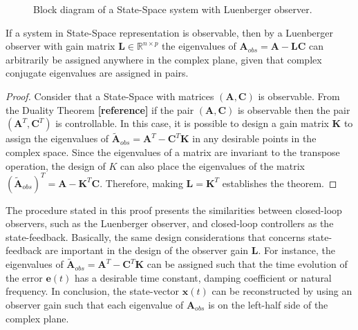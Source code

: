 \documentclass[a4paper,11pt]{book}
\numberwithin{figure}{chapter}
\numberwithin{equation}{chapter}
\numberwithin{table}{chapter}
\newtheorem{theorem}{Theorem}[chapter]
\theoremstyle{definition}
\newcounter{boxed-theorem}
\newenvironment{boxed-theorem}[1]
{\colorlet{shadecolor}{pastelBlue2!10} \begin{shaded} \begin{theorem}{#1}}
{\end{theorem} \end{shaded}}
\newcounter{boxed-definition}
\newcounter{boxed-example}
\begin{document}
\begin{figure}[ht]
{ 
    }
    \caption{Block diagram of a State-Space system with Luenberger observer.}
    \label{fig:luenberger01}
\end{figure}

\begin{boxed-theorem}
    If a system in State-Space representation is observable, then by a Luenberger observer with gain matrix $\bm{L} \in \mathbb{R}^{n \times p}$ the eigenvalues of $\bm{A}_{obs} = \bm{A} - \bm{L} \bm{C}$ can arbitrarily be assigned anywhere in the complex plane, given that complex conjugate eigenvalues are assigned in pairs.
\end{boxed-theorem} 

\begin{proof}
    Consider that a State-Space with matrices $(\bm{A}, \bm{C})$ is observable. From the Duality Theorem \textbf{[reference]} if the pair $(\bm{A}, \bm{C})$ is observable then the pair $(\bm{A}^T, \bm{C}^T)$ is controllable. In this case, it is possible to design     a gain matrix $\bm{K}$ to assign the eigenvalues of $\tilde{\bm{A}}_{obs} = \bm{A}^T - \bm{C}^T \bm{K}$ in any desirable points in the complex space. Since the eigenvalues of a matrix are invariant to the transpose operation, the design of $K$ can also place the eigenvalues of the matrix $(\tilde{\bm{A}}_{obs})^T = \bm{A} - \bm{K}^T \bm{C}$. Therefore, making $\bm{L} = \bm{K}^T$ establishes the theorem.
\end{proof}

The procedure stated in this proof presents the similarities between closed-loop observers, such as the Luenberger observer, and closed-loop controllers as the state-feedback. Basically, the same design considerations that concerns state-feedback are important in the design of the observer gain $\bm{L}$. For instance, the eigenvalues of $\tilde{\bm{A}}_{obs} = \bm{A}^T - \bm{C}^T \bm{K}$ can be assigned such that the time evolution of the error $\bm{e}(t)$ has a desirable time constant, damping coefficient or natural frequency. In conclusion, the state-vector $\bm{x}(t)$ can be reconstructed by using an observer gain such that each eigenvalue of $\bm{A}_{obs}$ is on the left-half side of the complex plane. 
\end{document}
